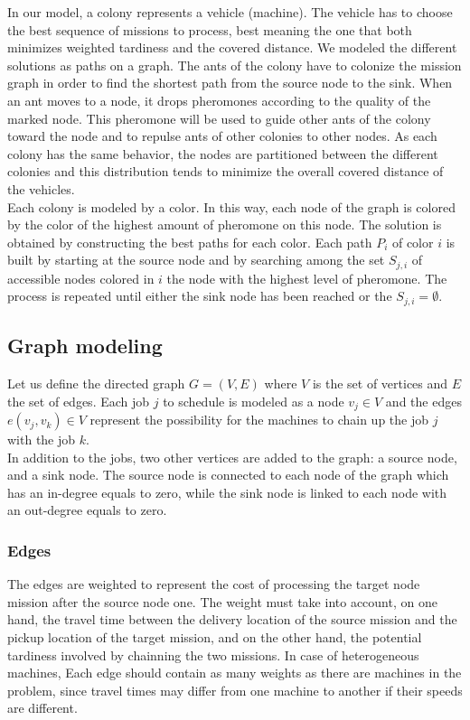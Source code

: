 \documentclass[a4paper,10pt]{article}
\begin{document}
In our model, a colony represents a vehicle (machine). The vehicle has to choose the best sequence of missions to process, best meaning the one that both minimizes weighted tardiness and the covered distance. We modeled the different solutions as paths on a graph. The ants of the colony have to colonize the mission graph in order to find the shortest path from the source node to the sink. When an ant moves to a node, it drops pheromones according to the quality of the marked node. This pheromone will be used to guide other ants of the colony toward the node and to repulse ants of other colonies to other nodes. As each colony has the same behavior, the nodes are partitioned between the different colonies and this distribution tends to minimize the overall covered distance of the vehicles.\\

Each colony is modeled by a color. In this way, each node of the graph is colored by the color of the highest amount of pheromone on this node. The solution is obtained by constructing the best paths for each color. Each path $P_i$ of color $i$ is built by starting at the source node and by searching among the set $S_{j,i}$ of accessible nodes colored in $i$ the node with the highest level of pheromone. The process is repeated until either the sink node has been reached or the $S_{j,i} = \emptyset$.

\subsection{Graph modeling}
Let us define the directed graph $G = (V,E)$ where $V$ is the set of vertices and $E$ the set of edges. Each job $j$ to schedule is modeled as a node $v_j \in V$ and the edges $e(v_j,v_k) \in V$ represent the possibility for the machines to chain up the job $j$ with the job $k$.\\

In addition to the jobs, two other vertices are added to the graph: a source node, and a sink node. The source node is connected to each node of the graph which has an in-degree equals to zero, while the sink node is linked to each node with an out-degree equals to zero. %


\subsubsection{Edges}
The edges are weighted to represent the cost of processing the target node mission after the source node one. The weight must take into account, on one hand, the travel time between the delivery location of the source mission and the pickup location of the target mission, and on the other hand, the potential tardiness involved by chainning the two missions. In case of heterogeneous machines, Each edge should contain as many weights as there are machines in the problem, since travel times may differ from one machine to another if their speeds are different.\\
\end{document}
